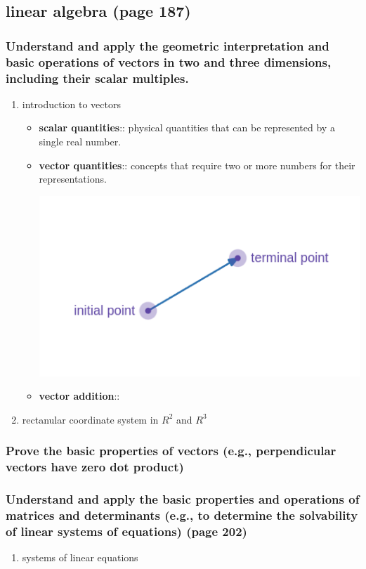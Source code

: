 \documentclass[11pt]{article}
\begin{document}
\subsection{linear algebra (page 187)}
\label{sec:org5bae3f7}
\subsubsection{Understand and apply the geometric interpretation and basic operations of vectors in two and three dimensions, including their scalar multiples.}
\label{sec:orga4c45f2}
\begin{enumerate}
\item introduction to vectors
\label{sec:orgfc4db81}
\begin{itemize}
\item \textbf{scalar quantities}:: physical quantities that can be represented by a single real number.
\item \textbf{vector quantities}:: concepts that require two or more numbers for their representations.
\begin{center}
\includegraphics[width=.9\linewidth]{./resources/vectorparts.png}
\end{center}
\item \textbf{vector addition}::
\end{itemize}
\item rectanular coordinate system in \(R^2\) and \(R^3\)
\label{sec:orgedca1fa}
\end{enumerate}
\subsubsection{Prove the basic properties of vectors (e.g., perpendicular vectors have zero dot product)}
\label{sec:orgc52d026}
\subsubsection{Understand and apply the basic properties and operations of matrices and determinants (e.g., to determine the solvability of linear systems of equations) (page 202)}
\label{sec:orgae78fc2}
\begin{enumerate}
\item systems of linear equations
\label{sec:org8697fec}
\end{enumerate}
\end{document}
